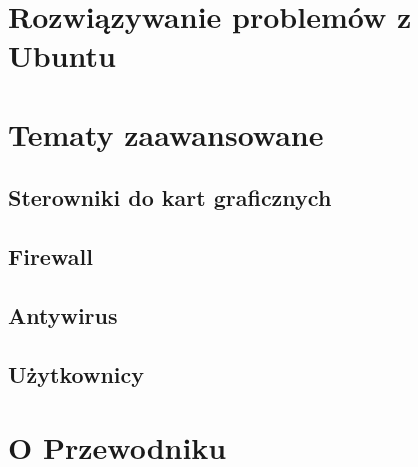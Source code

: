 \documentclass[a4paper,11pt,oneside]{mwart}
\begin{document}
	\section{Rozwiązywanie problemów z Ubuntu}
			
	\section{Tematy zaawansowane}
		\subsection{Sterowniki do kart graficznych}
			
		\subsection{Firewall}
			
		\subsection{Antywirus}
			
		\subsection{Użytkownicy}
			
	\section{O Przewodniku}
		
\end{document}
